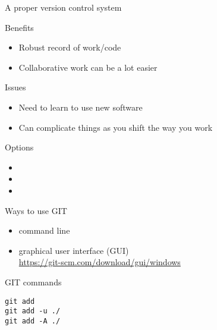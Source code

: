 \begin{frame}{A proper version control system}
  
  \begin{block}{Benefits}
    \begin{itemize}
    \item Robust record of work/code
    \item Collaborative work can be a lot easier
    \end{itemize}
  \end{block}

  \begin{block}{Issues}
    \begin{itemize}
    \item Need to learn to use new software
    \item Can complicate things as you shift the way you work
    \end{itemize}
  \end{block}

\end{frame}


\begin{frame}{Options}
  
  \begin{itemize}
  \item[subversion]
  \item[Mercurial]
  \item[GIT]
  \end{itemize}

  

\end{frame}


\begin{frame}{Ways to use GIT}
  
  \begin{itemize}
  \item command line
  \item graphical user interface (GUI)\\\url{https://git-scm.com/download/gui/windows}
  \end{itemize}

\end{frame}


\begin{frame}[fragile]{GIT commands}
  
\begin{verbatim}
git add
git add -u ./
git add -A ./
\end{verbatim}

\end{frame}


